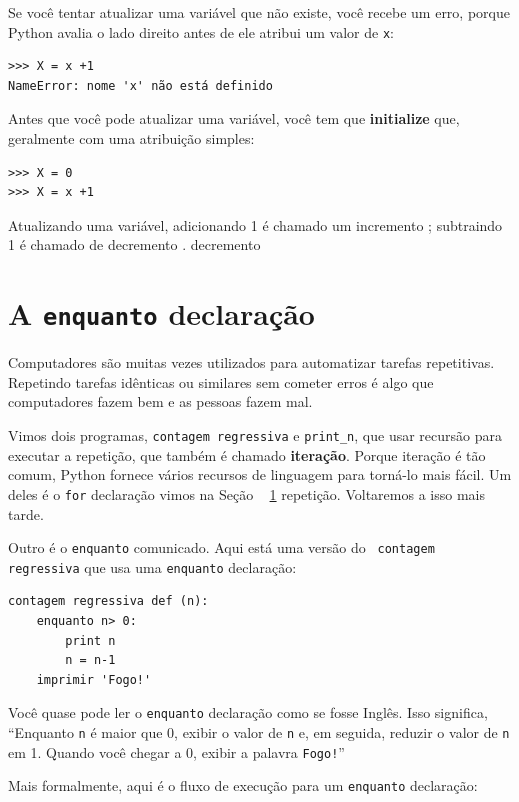 \documentclass[10pt]{book}
\begin{document}
\begin{exercise}
{{Se você tentar atualizar uma variável que não existe, você recebe um
erro, porque Python avalia o lado direito antes de ele atribui
um valor de {\tt x}:

\begin{verbatim}
>>> X = x +1
NameError: nome 'x' não está definido
\end{verbatim}
%
Antes que você pode atualizar uma variável, você tem que {\bf initialize}
que, geralmente com uma atribuição simples:

\begin{verbatim}
>>> X = 0
>>> X = x +1
\end{verbatim}
%
Atualizando uma variável, adicionando 1 é chamado um incremento {\bf};
subtraindo 1 é chamado de decremento {\bf}.
\index{} decremento




\section{A {\tt enquanto} declaração}

Computadores são muitas vezes utilizados para automatizar tarefas repetitivas. Repetindo
tarefas idênticas ou similares sem cometer erros é algo que
computadores fazem bem e as pessoas fazem mal.

Vimos dois programas, {\tt contagem regressiva} e \verb "print_n", que
usar recursão para executar a repetição, que também é chamado {\bf
iteração}. Porque iteração é tão comum, Python fornece vários
recursos de linguagem para torná-lo mais fácil. Um deles é o {\tt for} declaração
vimos na Seção ~ \ref {} repetição. Voltaremos a isso mais tarde.

Outro é o {\tt enquanto} comunicado. Aqui está uma versão do {\tt
contagem regressiva} que usa uma {\tt enquanto} declaração:

\begin{verbatim}
contagem regressiva def (n):
    enquanto n> 0:
        print n
        n = n-1
    imprimir 'Fogo!'
\end{verbatim}
%
Você quase pode ler o {\tt enquanto} declaração como se fosse Inglês.
Isso significa, ``Enquanto {\tt n} é maior que 0,
exibir o valor de {\tt n} e, em seguida, reduzir o valor de
{\tt n} em 1. Quando você chegar a 0, exibir a palavra {\tt Fogo!}''

Mais formalmente, aqui é o fluxo de execução para um {\tt enquanto} declaração:

}}
\end{exercise}
\end{document}
